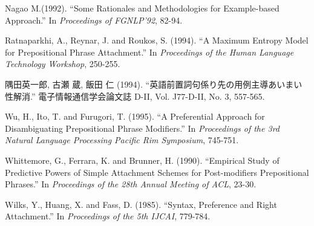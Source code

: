 \begin{thebibliography}{18}
	Nagao M.(1992). ``Some Rationales and Methodologies for Example-based Approach.''
	In {\it Proceedings of FGNLP'92}, 82-94. 

	Ratnaparkhi, A., Reynar, J. and Roukos, S. (1994).
	  ``A Maximum Entropy Model for Prepositional Phrase Attachment.''
	  In {\it Proceedings of the Human Language Technology Workshop}, 
	  250-255.

	隅田英一郎, 古瀬 蔵, 飯田 仁 (1994). ``英語前置詞句係り先の用例主導あいまい性解消.'' 
	  電子情報通信学会論文誌 D-II, Vol. J77-D-II, No. 3, 557-565.


	Wu, H., Ito, T. and Furugori, T. (1995). ``A Preferential 
	  Approach for Disambiguating Prepositional Phrase Modifiers.'' 
	  In {\it Proceedings of the 3rd Natural Language Processing Pacific 
	  Rim Symposium}, 745-751.

	Whittemore, G., Ferrara, K. and Brunner, H. (1990). 
	  ``Empirical Study of Predictive Powers of Simple Attachment Schemes 
	  for Post-modifiers Prepositional Phrases.'' In {\it Proceedings of the
	  28th Annual Meeting of ACL}, 23-30.

	Wilks, Y., Huang, X. and Fass, D. (1985). ``Syntax, 
	  Preference and Right Attachment.'' In {\it Proceedings of the 5th 
	  IJCAI}, 779-784.

\end{thebibliography}

\clearpage

\begin{biography}


\end{biography}


